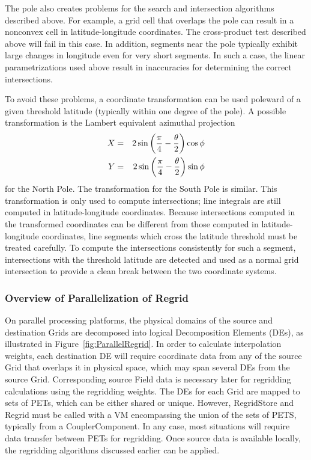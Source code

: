      The pole also creates problems for the search and intersection algorithms
     described above.  For example, a grid cell that overlaps the pole can
     result in a nonconvex cell in latitude-longitude coordinates.  The
     cross-product test described above will fail in this case.  In addition,
     segments near the pole typically exhibit large changes in longitude even
     for very short segments.  In such a case, the linear parametrizations used
     above result in inaccuracies for determining the correct intersections.

     To avoid these problems, a coordinate transformation can be used poleward
     of a given threshold latitude (typically within one degree of the pole).
     A possible transformation is the Lambert equivalent azimuthal projection
\begin{eqnarray}
X &=& 2\sin\left({\pi \over 4} - {\theta \over 2}\right)\cos\phi \nonumber \\
Y &=& 2\sin\left({\pi \over 4} - {\theta \over 2}\right)\sin\phi 
\end{eqnarray}
     for the North Pole.  The transformation for the South Pole is similar.
     This transformation is only used to compute intersections; line integrals
     are still computed in latitude-longitude coordinates.  Because intersections
     computed in the transformed coordinates can be different from those computed
     in latitude-longitude coordinates, line segments which cross the latitude
     threshold must be treated carefully.  To compute the intersections
     consistently for such a segment, intersections with the threshold latitude
     are detected and used as a normal grid intersection to provide a clean break
     between the two coordinate systems.

\subsubsection{Overview of Parallelization of Regrid}
On parallel processing platforms, the physical domains of the source and
destination Grids are decomposed into logical Decomposition Elements (DEs), as
illustrated in Figure~\ref{fig:ParallelRegrid}.  In order to calculate
interpolation weights, each destination DE will require coordinate
data from any of the source Grid that
overlaps it in physical space, which may span several DEs from the source Grid.
Corresponding source Field data is necessary later for regridding calculations
using the regridding weights.  The DEs for each Grid are mapped to sets of PETs,
which can be either shared or unique.  However, RegridStore and Regrid must
be called with a VM encompassing the union of the sets of PETS, typically from
a CouplerComponent.  In any case, most situations will require data transfer
between PETs for regridding.  Once source data is available locally, the
regridding algorithms discussed earlier can be applied.

